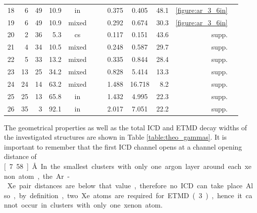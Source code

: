 \documentclass[journal=jpccck,manuscript=article]{achemso}
\begin{document}
\begin{table}[H]
\begin{tabular}{rrrrcccccrrr}
18 &     6 &    49 & 10.9  & in    &         &          & 0.375 & 0.405 &  48.1& \ref{figure:ar_3_6in}\\ %
19 &     6 &    49 & 10.9  & mixed &         &          & 0.292 & 0.674 &  30.3& \ref{figure:ar_3_6in}\\ %
                                                                                                 \midrule
20 &     2 &    36 &  5.3  & cs    &         &          & 0.117 & 0.151 &  43.6& supp.\\                        %
21 &     4 &    34 & 10.5  & mixed &         &          & 0.248 & 0.587 &  29.7& supp.\\                        %
22 &     5 &    33 & 13.2  & mixed &         &          & 0.335 & 0.844 &  28.4& supp.\\                        %
23 &    13 &    25 & 34.2  & mixed &         &          & 0.828 & 5.414 &  13.3& supp.\\                        %
24 &    24 &    14 & 63.2  & mixed &         &          & 1.488 &16.718 &   8.2& supp.\\                        %
25 &    25 &    13 & 65.8  & in    &         &          & 1.432 & 4.995 &  22.3& supp.\\                        %
26 &    35 &     3 & 92.1  & in    &         &          & 2.017 & 7.051 &  22.2& supp.\\                        %
\bottomrule
\end{tabular}
\end{table}
%
The geometrical properties as well as the total ICD and ETMD decay widths
of the investigated structures are shown in Table \ref{table:theo_gammas}.
It is important to remember that the first ICD channel opens at a
channel opening distance of \unit[7.58]{\AA}. In the smallest
clusters with only one argon layer around each
xenon atom, the Ar-Xe pair distances are below that value, therefore 
no ICD can take place. Also, by definition, two Xe atoms are
required for ETMD(3), hence it cannot occur in clusters with only one xenon atom.
%
\end{document}
